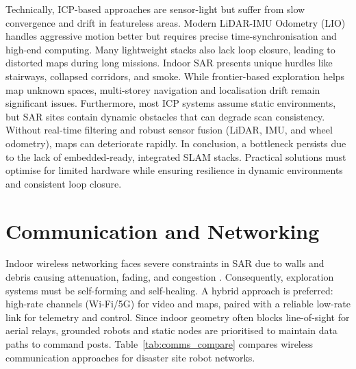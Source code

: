 Technically, ICP-based approaches are sensor-light but suffer from slow convergence and drift in featureless areas. Modern LiDAR-IMU Odometry (LIO) handles aggressive motion better but requires precise time-synchronisation and high-end computing. Many lightweight stacks also lack loop closure, leading to distorted maps during long missions. Indoor SAR presents unique hurdles like stairways, collapsed corridors, and smoke. While frontier-based exploration helps map unknown spaces, multi-storey navigation and localisation drift remain significant issues. Furthermore, most ICP systems assume static environments, but SAR sites contain dynamic obstacles that can degrade scan consistency. Without real-time filtering and robust sensor fusion (LiDAR, IMU, and wheel odometry), maps can deteriorate rapidly. In conclusion, a bottleneck persists due to the lack of embedded-ready, integrated SLAM stacks. Practical solutions must optimise for limited hardware while ensuring resilience in dynamic environments and consistent loop closure.

\section{Communication and Networking}
\label{sec:lit_comms}

Indoor wireless networking faces severe constraints in SAR due to walls and debris causing attenuation, fading, and congestion \cite{matracia2022}. Consequently, exploration systems must be self-forming and self-healing. A hybrid approach is preferred: high-rate channels (Wi-Fi/5G) for video and maps, paired with a reliable low-rate link for telemetry and control. Since indoor geometry often blocks line-of-sight for aerial relays, grounded robots and static nodes are prioritised to maintain data paths to command posts. Table~\ref{tab:comms_compare} compares wireless communication approaches for disaster site robot networks.

